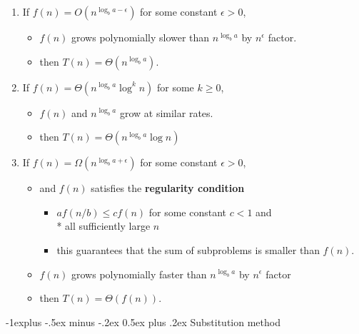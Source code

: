 \documentclass[10pt, landscape]{article}
\makeatletter
\renewcommand{\subsection}{\@startsection{subsection}{2}{0mm}%
  {-1explus -.5ex minus -.2ex}%
  {0.5ex plus .2ex}%
{\normalfont\normalsize\bfseries}}
\makeatother
\begin{document}
\begin{multicols*}{4}
  \begin{enumerate}
    \item If $f(n) = O(n^{\log_b a-\epsilon})$ for some constant  $\epsilon > 0$, 
      \begin{itemize}
        \item $f(n)$ grows polynomially slower than $n^{\log_ba}$ by $n^\epsilon$ factor.
        \item then $T(n) = \Theta(n^{\log_ba})$.
      \end{itemize}
    \item If $f(n) = \Theta(n^{\log_ba} \log^kn) $ for some $k \geq 0$,
      \begin{itemize}
        \item $f(n)$ and $n^{\log_ba}$ grow at similar rates.
        \item then $T(n) = \Theta(n^{\log_ba}\log n)$
      \end{itemize}
    \item If $f(n) = \Omega(n^{\log_ba + \epsilon})$ for some constant $\epsilon > 0$, 
      \begin{itemize}
        \item and $f(n)$ satisfies the \textbf{regularity condition} 
          \begin{itemize}
            \item $af(n/b) \leq cf(n)$ for some constant $c<1$ and \\* all sufficiently large $n$
            \item this guarantees that the sum of subproblems is smaller than $f(n)$.
          \end{itemize} 
        \item $f(n)$ grows polynomially faster than $n^{\log_ba}$ by $n^\epsilon$ factor
        \item then $T(n) = \Theta(f(n))$.
      \end{itemize}
  \end{enumerate}

  \subsection{Substitution method}


\end{multicols*}
\end{document}
